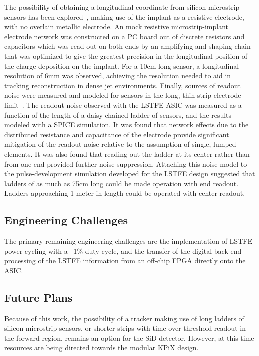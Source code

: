 \documentclass[12pt]{report}
\begin{document}
The possibility of obtaining a longitudinal coordinate from silicon
microstrip sensors has been explored~\cite{Carman2011118}, making use of the 
implant as a resistive electrode, with no overlain metallic electrode. An mock resistive 
microstrip-implant electrode network was constructed on a PC board out of discrete resistors and capacitors 
which was read out on both ends by an amplifying and shaping chain that was optimized to give the greatest 
precision in the longitudinal position of the charge deposition on the implant. For a 10cm-long sensor,
a longitudinal resolution of 6mm was observed, achieving the resolution needed to aid in tracking
reconstruction in dense jet environments. Finally, sources of readout noise were measured and modeled 
for sensors in the long, thin strip electrode limit~\cite{Collier2013127}. The readout noise observed 
with the LSTFE ASIC was measured as a function of the length of a daisy-chained ladder of sensors, 
and the results modeled with a SPICE simulation. It was found that network effects due to the
distributed resistance and capacitance of the electrode provide significant 
mitigation of the readout noise relative to the assumption of single, lumped elements. It
was also found that reading out the ladder at its center rather than from one end provided
further noise suppression. Attaching this noise model to the pulse-development simulation
developed for the LSTFE design suggested that ladders of as much as 75cm long could be
made operation with end readout. Ladders approaching 1 meter in length could be operated with center readout.



\subsection{Engineering Challenges}

The primary remaining engineering challenges are the implementation of LSTFE power-cycling with a ~1\%
duty cycle, and the transfer of the digital back-end processing of the LSTFE information from
an off-chip FPGA directly onto the ASIC.

\subsection{Future Plans}

Because of this work, the possibility of a tracker making use of long ladders of silicon
microstrip sensors, or shorter strips with time-over-threshold readout in the forward
region, remains an option for the SiD detector. However, at this time resources are
being directed towards the modular KPiX design.
\end{document}

